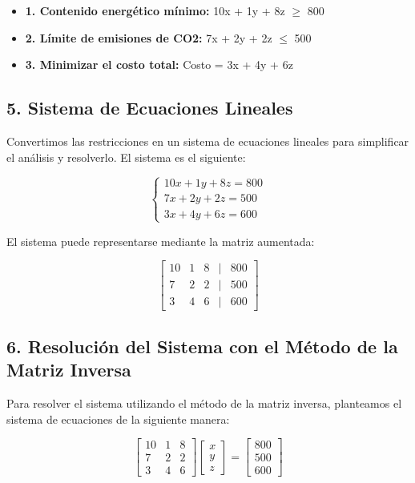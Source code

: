 \documentclass[]{article}
\begin{document}
	\begin{itemize}
		\item \textbf{1. Contenido energético mínimo:} 10x + 1y + 8z $\geq$ 800
		\item \textbf{2. Límite de emisiones de CO2:} 7x + 2y + 2z $\leq$ 500
		\item \textbf{3. Minimizar el costo total:} Costo = 3x + 4y + 6z
	\end{itemize}
	
	\subsection*{5. Sistema de Ecuaciones Lineales}
	Convertimos las restricciones en un sistema de ecuaciones lineales para simplificar el análisis y resolverlo. El sistema es el siguiente:
	
	\[ 
	\begin{cases}
		10x + 1y + 8z = 800 \\
		7x + 2y + 2z = 500 \\
		3x + 4y + 6z = 600
	\end{cases}
	\]
	
	El sistema puede representarse mediante la matriz aumentada:
	
	\[
	\begin{bmatrix}
		10 & 1 & 8 & | & 800 \\
		7 & 2 & 2 & | & 500 \\
		3 & 4 & 6 & | & 600
	\end{bmatrix}
	\]
	
	\subsection*{6. Resolución del Sistema con el Método de la Matriz Inversa}
	Para resolver el sistema utilizando el método de la matriz inversa, planteamos el sistema de ecuaciones de la siguiente manera:
	
	\[
	\begin{bmatrix}
		10 & 1 & 8 \\
		7 & 2 & 2 \\
		3 & 4 & 6
	\end{bmatrix}
	\begin{bmatrix}
		x \\
		y \\
		z
	\end{bmatrix}
	=
	\begin{bmatrix}
		800 \\
		500 \\
		600
	\end{bmatrix}
	\]
	
\end{document}
